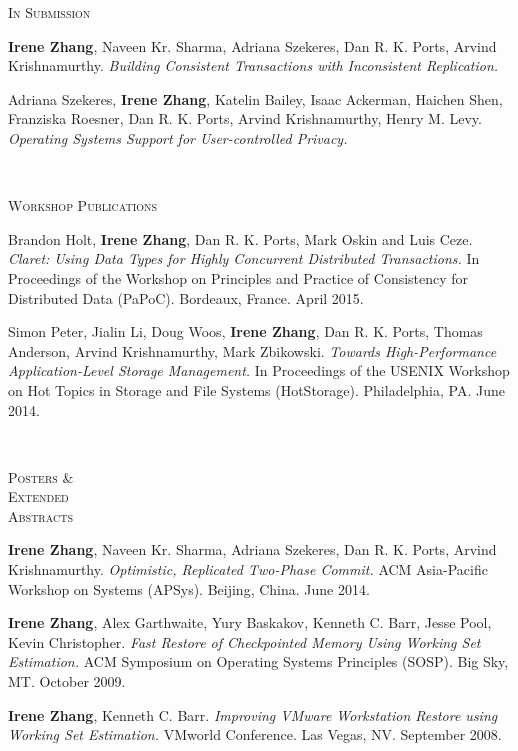 \documentclass[10pt,times]{report}
\newlength{\sectiongap}
\newlength{\sectioncolwidth}
\newlength{\colgap}
\newlength{\stuffwidth}
\newenvironment{rtable}{
  \begin{minipage}{\textwidth}
  }{
  \end{minipage}
}
\newenvironment{rsection}[1]{
  \begin{minipage}[t]{\sectioncolwidth}
    \textsc{#1}
  \end{minipage}
  \hspace{\colgap}
  \begin{minipage}[t]{\stuffwidth}
  }{
    \removelastskip
  \end{minipage}
  \\[\sectiongap]
}
\begin{document}
\begin{rtable}
  \begin{rsection}{In Submission}
    \textbf{Irene Zhang}, Naveen Kr. Sharma, Adriana Szekeres, Dan
    R. K. Ports,
    Arvind Krishnamurthy. \textit{Building Consistent Transactions with Inconsistent
      Replication.}\\\vspace{-0.5em}
    
    Adriana Szekeres, \textbf{Irene Zhang}, Katelin Bailey, Isaac
    Ackerman, Haichen Shen, Franziska Roesner, Dan R. K. Ports, Arvind
    Krishnamurthy, Henry M. Levy. \textit{Operating Systems Support
      for User-controlled Privacy.}\\\vspace{-0.5em}
  \end{rsection}
  
  \begin{rsection}{Workshop Publications}
    Brandon Holt, \textbf{Irene Zhang}, Dan R. K. Ports, Mark Oskin and Luis
    Ceze.  \textit{Claret: Using Data Types for Highly Concurrent
      Distributed Transactions.} In Proceedings of the Workshop on
    Principles and Practice of Consistency for Distributed Data
    (PaPoC).  Bordeaux, France. April 2015.\\\vspace{-0.5em}


    Simon Peter, Jialin Li, Doug Woos, \textbf{Irene Zhang}, Dan
    R. K. Ports, Thomas Anderson, Arvind Krishnamurthy, Mark
    Zbikowski. \textit{Towards High-Performance Application-Level
      Storage Management.} In Proceedings of the
    USENIX Workshop on Hot Topics in Storage and File Systems (HotStorage). Philadelphia, PA. June 2014. \\\vspace{-0.5em}
  \end{rsection}

  \begin{rsection}{Posters \&\\Extended\\Abstracts}
    \textbf{Irene Zhang}, Naveen Kr. Sharma, Adriana Szekeres, Dan
    R. K. Ports, Arvind Krishnamurthy. \textit{Optimistic, Replicated
      Two-Phase Commit.}  ACM Asia-Pacific Workshop on Systems (APSys). Beijing, China. June 2014.\\\vspace{-0.5em}

    \textbf{Irene Zhang}, Alex Garthwaite, Yury Baskakov, Kenneth
    C. Barr, Jesse Pool, Kevin Christopher. \textit{Fast Restore of
      Checkpointed Memory Using Working Set Estimation.} ACM Symposium
    on Operating Systems Principles (SOSP).  Big Sky, MT. October
    2009.\\\vspace{-0.5em}

    \textbf{Irene Zhang}, Kenneth C. Barr.  \textit{Improving VMware
      Workstation Restore using Working Set Estimation.}  VMworld
    Conference. Las Vegas, NV. September 2008.\\ \vspace{-0.5em}
  \end{rsection}
\end{rtable}
\end{document}
